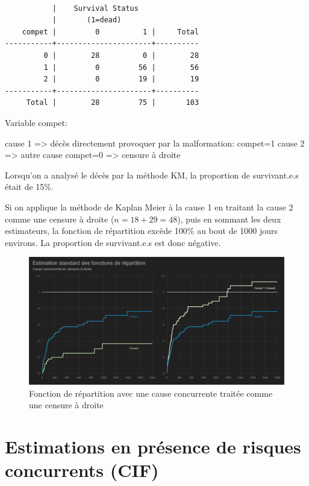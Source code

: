 \documentclass[
  12pt,
  letterpaper,
  DIV=11,
  numbers=noendperiod,
  onepage,
  openany]{scrreprt}
\begin{document}
\begin{verbatim}

           |    Survival Status
           |       (1=dead) 
    compet |         0          1 |     Total
-----------+----------------------+----------
         0 |        28          0 |        28 
         1 |         0         56 |        56 
         2 |         0         19 |        19 
-----------+----------------------+----------
     Total |        28         75 |       103 
\end{verbatim}

Variable compet:

cause 1 =\textgreater{} décès directement provoquer par la malformation:
compet=1 cause 2 =\textgreater{} autre cause compet=0 =\textgreater{}
censure à droite

Lorsqu'on a analysé le décès par la méthode KM, la proportion de
survivant.e.s était de 15\%.

Si on applique la méthode de Kaplan Meier à la cause 1 en traitant la
cause 2 comme une censure à droite (\(n=18+29=48\)), puis en sommant les
deux estimateurs, la fonction de répartition excède 100\% au bout de
1000 jours environs. La proportion de survivant.e.s est donc négative.

\begin{figure}

\caption{Fonction de répartition avec une cause concurrente traitée
comme une censure à droite}

{\centering \includegraphics{images/Image16.png}

}

\end{figure}

\hypertarget{estimations-en-pruxe9sence-de-risques-concurrents-cif}{%
\section{\texorpdfstring{\textbf{Estimations en présence de risques
concurrents
(CIF)}}{Estimations en présence de risques concurrents (CIF)}}\label{estimations-en-pruxe9sence-de-risques-concurrents-cif}}
\end{document}

